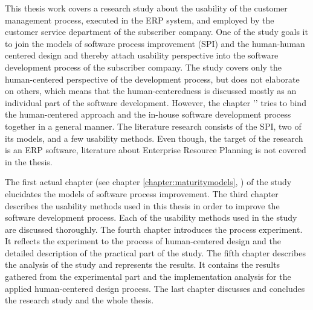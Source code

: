 \documentclass[12pt,a4paper,oneside,pdftex]{report}
\begin{document}
This thesis work covers a research study about the usability of the customer management process, executed in the ERP system, and employed by the customer service department of the subscriber company. One of the study goals it to join the models of software process improvement (SPI) and the human-human centered design and thereby attach usability perspective into the software development process of the subscriber company. The study covers only the human-centered perspective of the development process, but does not elaborate on others, which means that the human-centeredness is discussed mostly as an individual part of the software development. However, the chapter '' tries to bind the human-centered approach and the in-house software development process together in a general manner. The literature research consists of the SPI, two of its models, and a few usability methods. Even though, the target of the research is an ERP software, literature about Enterprise Resource Planning is not covered in the thesis.

The first actual chapter (see chapter \ref{chapter:maturitymodels}, ) of the study elucidates the models of software process improvement. The third chapter describes the usability methods used in this thesis in order to improve the software development process. Each of the usability methods used in the study are discussed thoroughly. The fourth chapter introduces the process experiment. It reflects the experiment to the process of human-centered design and the detailed description of the practical part of the study. The fifth chapter describes the analysis of the study and represents the results. It contains the results gathered from the experimental part and the implementation analysis for the applied human-centered design process. The last chapter discusses and concludes the research study and the whole thesis.

    
    





\end{document}
